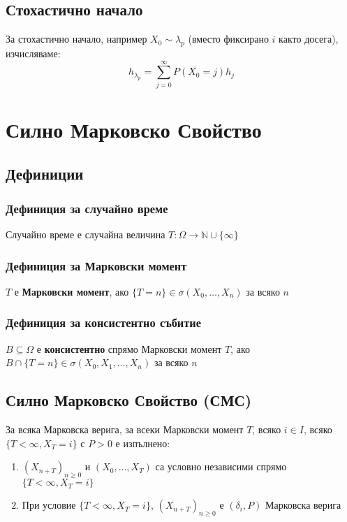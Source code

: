 \documentclass{article}
\begin{document}
\subsection{Стохастично начало}
За стохастично начало, например $X_0 \sim \lambda_p$ (вместо фиксирано $i$ както досега), изчисляваме:
$$ h_{\lambda_p} = \sum_{j=0}^\infty P(X_0 = j) h_j $$

\section{Силно Марковско Свойство}
\subsection{Дефиниции}
\subsubsection*{Дефиниция за случайно време}
Случайно време е случайна величина $T: \Omega \to \mathbb{N} \cup \{\infty\}$

\subsubsection*{Дефиниция за Марковски момент}
$T$ е \textbf{Марковски момент}, ако $\{T=n\} \in \sigma(X_0,\dots,X_n)$ за всяко $n$

\subsubsection*{Дефиниция за консистентно събитие}
$B \subseteq \Omega$ е \textbf{консистентно} спрямо Марковски момент $T$, ако \\
$B \cap \{T=n\} \in \sigma(X_0,X_1,\dots,X_n)$ за всяко $n$

\subsection{Силно Марковско Свойство (СМС)}
За всяка Марковска верига, за всеки Марковски момент $T$, всяко $i \in I$, всяко $\{T<\infty, X_T=i\}$ с $P>0$ е изпълнено:
\begin{enumerate}
\item $(X_{n+T})_{n\geq0}$ и $(X_0,\dots,X_T)$ са условно независими спрямо $\{T<\infty, X_T=i\}$
\item При условие $\{T<\infty, X_T=i\}$, $(X_{n+T})_{n\geq0}$ е $(\delta_i,P)$ Марковска верига
\end{enumerate}
\end{document}
